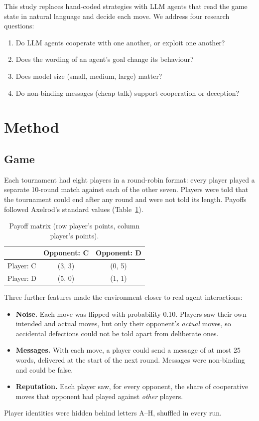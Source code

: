 \documentclass[11pt,a4paper]{article}
\begin{document}
This study replaces hand-coded strategies with LLM agents that read the game state in natural language and decide each move. We address four research questions:

\begin{enumerate}[label=\textbf{RQ\arabic*.}]
  \item Do LLM agents cooperate with one another, or exploit one another?
  \item Does the wording of an agent's goal change its behaviour?
  \item Does model size (small, medium, large) matter?
  \item Do non-binding messages (cheap talk) support cooperation or deception?
\end{enumerate}

\section{Method}

\subsection{Game}

Each tournament had eight players in a round-robin format: every player played a separate 10-round match against each of the other seven. Players were told that the tournament could end after any round and were not told its length. Payoffs followed Axelrod's standard values (Table~\ref{tab:payoff}).

\begin{table}[htbp]
\centering
\caption{Payoff matrix (row player's points, column player's points).}
\label{tab:payoff}
\begin{tabular}{lcc}
\toprule
 & Opponent: C & Opponent: D \\
\midrule
Player: C & (3, 3) & (0, 5) \\
Player: D & (5, 0) & (1, 1) \\
\bottomrule
\end{tabular}
\end{table}

\noindent Three further features made the environment closer to real agent interactions:
\begin{itemize}
  \item \textbf{Noise.} Each move was flipped with probability 0.10. Players saw their own intended and actual moves, but only their opponent's \emph{actual} moves, so accidental defections could not be told apart from deliberate ones.
  \item \textbf{Messages.} With each move, a player could send a message of at most 25 words, delivered at the start of the next round. Messages were non-binding and could be false.
  \item \textbf{Reputation.} Each player saw, for every opponent, the share of cooperative moves that opponent had played against \emph{other} players.
\end{itemize}
Player identities were hidden behind letters A--H, shuffled in every run.
\end{document}
